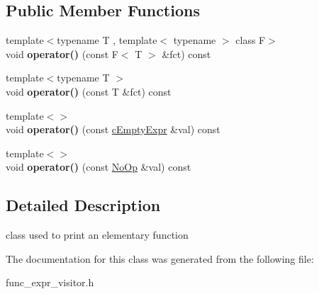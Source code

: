 \subsection*{Public Member Functions}
\begin{DoxyCompactItemize}
\item 
\hypertarget{classcOutputVisitor_a96513d56b491ef22e4d662182add1142}{{\footnotesize template$<$typename T , template$<$ typename $>$ class F$>$ }\\void {\bfseries operator()} (const F$<$ T $>$ \&fct) const }\label{classcOutputVisitor_a96513d56b491ef22e4d662182add1142}

\item 
\hypertarget{classcOutputVisitor_a531e75ef7e5d0e92e4815934964d1bc8}{{\footnotesize template$<$typename T $>$ }\\void {\bfseries operator()} (const T \&fct) const }\label{classcOutputVisitor_a531e75ef7e5d0e92e4815934964d1bc8}

\item 
\hypertarget{classcOutputVisitor_abe29e2af99d60e7444f0b4a3ea71d5e4}{{\footnotesize template$<$$>$ }\\void {\bfseries operator()} (const \hyperlink{structcEmptyExpr}{c\-Empty\-Expr} \&val) const }\label{classcOutputVisitor_abe29e2af99d60e7444f0b4a3ea71d5e4}

\item 
\hypertarget{classcOutputVisitor_adfb1e4753092723e985718d24ed96ba6}{{\footnotesize template$<$$>$ }\\void {\bfseries operator()} (const \hyperlink{structNoOp}{No\-Op} \&val) const }\label{classcOutputVisitor_adfb1e4753092723e985718d24ed96ba6}

\end{DoxyCompactItemize}


\subsection{Detailed Description}
class used to print an elementary function 

The documentation for this class was generated from the following file\-:\begin{DoxyCompactItemize}
\item 
func\-\_\-expr\-\_\-visitor.\-h\end{DoxyCompactItemize}
